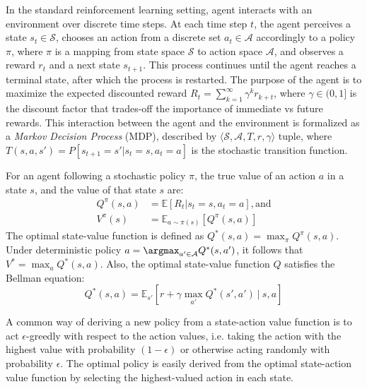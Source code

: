 In the standard reinforcement learning setting, agent interacts with an environment over discrete time steps.
    At each time step $t$, the agent perceives a state $s_{t} \in \mathcal{S}$, chooses an action from a discrete set $a_{t} \in \mathcal{A}$ accordingly to a policy $\pi$, where $\pi$ is a mapping from state space $\mathcal{S}$ to action space $\mathcal{A}$, and observes a reward $r_{t}$ and a next state $s_{t+1}$.
    This process continues until the agent reaches a terminal state, after which the process is restarted.
    The purpose of the agent is to maximize the expected discounted reward $R_{t} = \sum_{k=1}^\infty \gamma^k r_{k+t}$, where $\gamma \in (0, 1]$ is the discount factor that trades-off the importance of immediate vs future rewards.
    This interaction between the agent and the environment is formalized as a \emph{Markov Decision Process} (MDP), described by $\langle \mathcal{S}, \mathcal{A}, T, r, \gamma \rangle$ tuple, where $T(s, a, s') = P[s_{t+1} = s' | s_{t} = s, a_{t} = a]$ is the stochastic transition function.

For an agent following a stochastic policy $\pi$, the true value of an action $a$ in a state $s$, and the value of that state $s$ are:
    \begin{align}
        Q^{\pi}(s, a) &= \mathbb{E}[R_{t} | s_{t} = s, a_{t} = a], \text{and} \label{eq:1} \\
        V^{\pi}(s) &= \mathbb{E}_{a\sim \pi(s)}[Q^{\pi}(s, a)] \label{eq:2}
    \end{align}
    The optimal state-value function is defined as $Q^{*}(s, a) = \max_{\pi}Q^{\pi}(s, a)$.
    Under deterministic policy $a = \argmax_{a' \in \mathcal{A}}Q^{*}(s, a')$, it follows that $V^{*} = \max_{a}Q^{*}(s, a)$.
    Also, the optimal state-value function $Q$ satisfies the Bellman equation:
    \begin{equation}
        Q^{*}(s, a) = \mathbb{E}_{s'}\left[r + \gamma \max_{a'} Q^{*}(s', a') \:|\: s, a\right]
    \end{equation}

    A common way of deriving a new policy from a state-action value function is to act $\epsilon$-greedly with respect to the action values, i.e. taking the action with the highest value with probability $(1 - \epsilon)$ or otherwise acting randomly with probability $\epsilon$.
    The optimal policy is easily derived from the optimal state-action value function by selecting the highest-valued action in each state.


